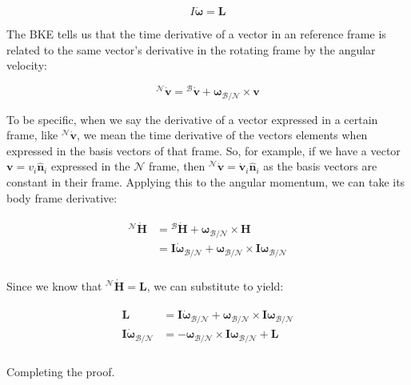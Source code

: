 \documentclass[
]{article}
\begin{document}
\[I \dot{\boldsymbol{\omega}} = \boldsymbol{L}\]

The BKE tells us that the time derivative of a vector in an reference
frame is related to the same vector's derivative in the rotating frame
by the angular velocity:

\[{}^\mathcal{N}\dot{\boldsymbol{v}} = {}^\mathcal{B}\dot{\boldsymbol{v}} + \boldsymbol{\omega}_\mathcal{B/N} \times \boldsymbol{v}\]

To be specific, when we say the derivative of a vector expressed in a
certain frame, like \({}^\mathcal{N}\dot{\boldsymbol{v}}\), we mean the
time derivative of the vectors elements when expressed in the basis
vectors of that frame. So, for example, if we have a vector
\(\boldsymbol{v} = v_i \hat{\boldsymbol{n}}_i\) expressed in the
\(\mathcal{N}\) frame, then
\({}^\mathcal{N}\dot{\boldsymbol{v}} = \dot{\boldsymbol{v}}_i \hat{\boldsymbol{n}}_i\)
as the basis vectors are constant in their frame. Applying this to the
angular momentum, we can take its body frame derivative:

\[\begin{aligned}
\begin{aligned}
    {}^\mathcal{N}\dot{\boldsymbol{H}} &= {}^\mathcal{B}\dot{\boldsymbol{H}} + \boldsymbol{\omega}_\mathcal{B/N} \times \boldsymbol{H} \\
    &= \boldsymbol{I} \dot{\boldsymbol{\omega}}_\mathcal{B/N} + \boldsymbol{\omega}_\mathcal{B/N} \times \boldsymbol{I} \boldsymbol{\omega}_\mathcal{B/N} \\
\end{aligned}
\end{aligned}\]

Since we know that
\({}^\mathcal{N}\dot{\boldsymbol{H}} = \boldsymbol{L}\), we can
substitute to yield:

\[\begin{aligned}
\begin{aligned}
    \boldsymbol{L} &= \boldsymbol{I} \dot{\boldsymbol{\omega}}_\mathcal{B/N} + \boldsymbol{\omega}_\mathcal{B/N} \times \boldsymbol{I} \boldsymbol{\omega}_\mathcal{B/N} \\
    \boldsymbol{I} \dot{\boldsymbol{\omega}}_\mathcal{B/N} &= -\boldsymbol{\omega}_\mathcal{B/N} \times \boldsymbol{I} \boldsymbol{\omega}_\mathcal{B/N} + \boldsymbol{L} \\
\end{aligned}
\end{aligned}\]

Completing the proof.
\end{document}
